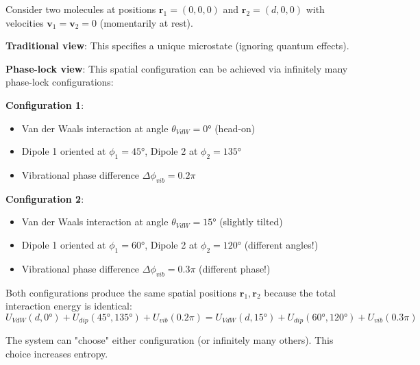 \documentclass[12pt,a4paper]{article}
\theoremstyle{remark}
\begin{document}
\begin{example}
Consider two molecules at positions $\mathbf{r}_1 = (0, 0, 0)$ and $\mathbf{r}_2 = (d, 0, 0)$ with velocities $\mathbf{v}_1 = \mathbf{v}_2 = 0$ (momentarily at rest).

\textbf{Traditional view}: This specifies a unique microstate (ignoring quantum effects).

\textbf{Phase-lock view}: This spatial configuration can be achieved via infinitely many phase-lock configurations:

\textbf{Configuration 1}:
\begin{itemize}
\item Van der Waals interaction at angle $\theta_{VdW} = 0°$ (head-on)
\item Dipole 1 oriented at $\phi_1 = 45°$, Dipole 2 at $\phi_2 = 135°$
\item Vibrational phase difference $\Delta\phi_{vib} = 0.2\pi$
\end{itemize}

\textbf{Configuration 2}:
\begin{itemize}
\item Van der Waals interaction at angle $\theta_{VdW} = 15°$ (slightly tilted)
\item Dipole 1 oriented at $\phi_1 = 60°$, Dipole 2 at $\phi_2 = 120°$ (different angles!)
\item Vibrational phase difference $\Delta\phi_{vib} = 0.3\pi$ (different phase!)
\end{itemize}

Both configurations produce the same spatial positions $\mathbf{r}_1, \mathbf{r}_2$ because the total interaction energy is identical:
\begin{equation}
U_{VdW}(d, 0°) + U_{dip}(45°, 135°) + U_{vib}(0.2\pi) = U_{VdW}(d, 15°) + U_{dip}(60°, 120°) + U_{vib}(0.3\pi)
\end{equation}

The system can "choose" either configuration (or infinitely many others). This choice increases entropy.
\end{example}
\end{document}
